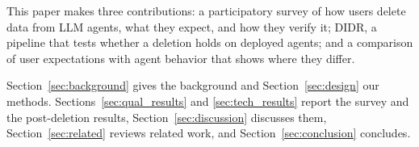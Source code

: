 This paper makes three contributions: a participatory survey of how users delete data from LLM agents, what they expect, and how they verify it; DIDR, a pipeline that tests whether a deletion holds on deployed agents; and a comparison of user expectations with agent behavior that shows where they differ.

Section~\ref{sec:background} gives the background and Section~\ref{sec:design} our methods. Sections~\ref{sec:qual_results} and \ref{sec:tech_results} report the survey and the post-deletion results, Section~\ref{sec:discussion} discusses them, Section~\ref{sec:related} reviews related work, and Section~\ref{sec:conclusion} concludes.
